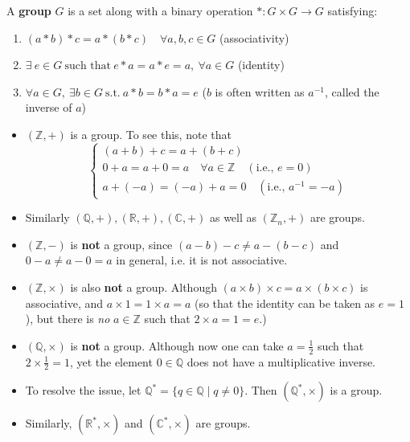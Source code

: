 \begin{definition} [Group] \label{def:group}
A \textbf{group} $G$ is a set along with a binary operation $* : G\times G \to G$ satisfying:
\begin{enumerate}
\item \((a*b)*c = a * (b * c) \quad \forall a,b,c \in G\) \quad (associativity)
\item \(\exists \ e \in G \ \text{such that} \ e * a = a * e = a, \ \forall a \in G\) \quad (identity)
\item \(\forall a \in G, \ \exists b \in G \ \text{s.t.} \ a * b = b * a = e\)  
($b$ is often written as $a^{-1}$, called the inverse of $a$)
\end{enumerate}
\end{definition}
\begin{example}
\begin{itemize}
\item[(a)] $(\mathbb{Z}, +)$ is a group. To see this, note that
\[
\begin{cases}
(a + b) + c = a + (b + c) \quad  \\
0 + a = a + 0 = a \quad \forall a \in \mathbb{Z} \quad (\text{i.e., $e = 0$}) \quad \\
a + (-a) = (-a) + a = 0 \quad (\text{i.e., $a^{-1} = -a$})
\end{cases}
\]
\item[(b)] Similarly $(\mathbb{Q}, +), (\mathbb{R}, +), (\mathbb{C}, +)$ as well as $(\mathbb{Z}_n,+)$ are groups.
\item[(c)] $(\mathbb{Z}, -)$ is \textbf{not} a group, since
\((a - b) - c \neq a - (b - c)\) and \(0 - a \neq a - 0 = a\)
in general, i.e. it is not associative.
\item[(d)] $(\mathbb{Z}, \times)$ is also \textbf{not} a group. Although $(a \times b) \times c = a \times (b \times c)$ is associative, and $a \times 1 = 1 \times a = a$ (so that the identity can be taken as $e = 1$), but there is {\it no} $a \in \mathbb{Z}$ such that
$2 \times a = 1 = e$.)
\item[(e)] $(\mathbb{Q}, \times)$ is \textbf{not} a group. Although now one can take $a = \frac{1}{2}$ such that $2 \times \frac{1}{2} = 1$, yet the element $0 \in \mathbb{Q}$ does not have a multiplicative inverse.
\item[(f)] To resolve the issue, let $\mathbb{Q}^* = \{ q \in \mathbb{Q} \mid q \neq 0 \}$. Then $(\mathbb{Q}^*, \times)$ is a group.
\item[(g)] Similarly, $(\mathbb{R}^*, \times)$ and $(\mathbb{C}^*, \times)$ are groups.

\end{itemize}
\end{example}
